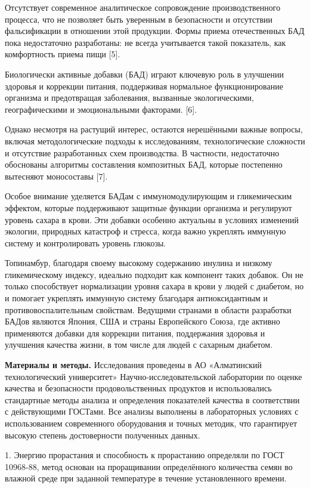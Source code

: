 Отсутствует современное аналитическое сопровождение производственного
процесса, что не позволяет быть уверенным в безопасности и отсутствии
фальсификации в отношении этой продукции. Формы приема отечественных БАД
пока недостаточно разработаны: не всегда учитывается такой показатель,
как комфортность приема пищи {[}5{]}.

Биологически активные добавки (БАД) играют ключевую роль в улучшении
здоровья и коррекции питания, поддерживая нормальное функционирование
организма и предотвращая заболевания, вызванные экологическими,
географическими и эмоциональными факторами. {[}6{]}.

Однако несмотря на растущий интерес, остаются нерешёнными важные
вопросы, включая методологические подходы к исследованиям,
технологические сложности и отсутствие разработанных схем производства.
В частности, недостаточно обоснованы алгоритмы составления композитных
БАД, которые постепенно вытесняют моносоставы {[}7{]}.

Особое внимание уделяется БАДам с иммуномодулирующим и гликемическим
эффектом, которые поддерживают защитные функции организма и регулируют
уровень сахара в крови. Эти добавки особенно актуальны в условиях
изменений экологии, природных катастроф и стресса, когда важно укреплять
иммунную систему и контролировать уровень глюкозы.

Топинамбур, благодаря своему высокому содержанию инулина и низкому
гликемическому индексу, идеально подходит как компонент таких добавок.
Он не только способствует нормализации уровня сахара в крови у людей с
диабетом, но и помогает укреплять иммунную систему благодаря
антиоксидантным и противовоспалительным свойствам. Ведущими странами в
области разработки БАДов являются Япония, США и страны Европейского
Союза, где активно применяются добавки для коррекции питания,
поддержания здоровья и улучшения качества жизни, в том числе для людей с
сахарным диабетом.

{\bfseries Материалы и методы.} Исследования проведены в АО «Алматинский
технологический университет» Научно-исследовательской лаборатории по
оценке качества и безопасности продовольственных продуктов и
использовались стандартные методы анализа и определения показателей
качества в соответствии с действующими ГОСТами. Все анализы выполнены в
лабораторных условиях с использованием современного оборудования и
точных методик, что гарантирует высокую степень достоверности полученных
данных.


1. Энергию прорастания и способность к прорастанию определяли по ГОСТ
10968-88, метод основан на проращивании определённого количества семян
во влажной среде при заданной температуре в течение установленного
времени.

